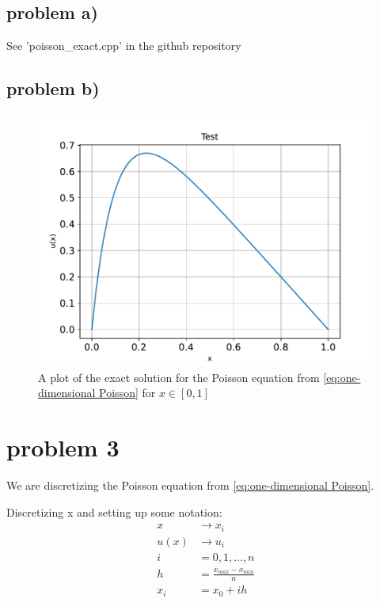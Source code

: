 \documentclass[english,notitlepage]{revtex4-1}  %
\begin{document}
	\subsection*{problem a)}
		See 'poisson\_exact.cpp' in the github repository
	\subsection*{problem b)}
		\begin{figure}[H]
			\centering
			\includegraphics[scale=0.55]{plots/poisson_exact.pdf} %
			\caption{A plot of the exact solution for the Poisson equation from \ref{eq:one-dimensional Poisson} for $x \in[0,1]$}
			\label{fig:Exact poisson}
		\end{figure}
\section*{problem 3}
	We are discretizing the Poisson equation from \ref{eq:one-dimensional Poisson}.

	Discretizing x and setting up some notation:
	\begin{equation*}
		\begin{split}
			x &\rightarrow x_i \\
			u(x) &\rightarrow u_i \\
			i &= 0,1,\dots,n \\
			h &= \frac{x_{max} - x_{min}}{n} \\
			x_i &= x_0 + ih 
		\end{split}
	\end{equation*}
\end{document}
